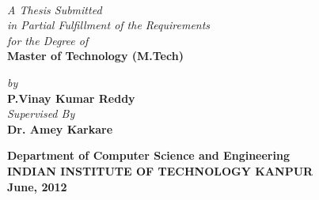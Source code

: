 \titlepage
\thispagestyle{empty}
\begin{center}
\\
\end{center}\vspace{15mm}
\begin{center}
{\it{A Thesis Submitted}}\\
{\it{in Partial Fulfillment of the Requirements}}\\
{\it{for the Degree of}}\\

{\bf {\large Master of Technology (M.Tech)}}\\
\vspace{15mm}

{\it{by}} \\
{\bf{\large P.Vinay Kumar Reddy}}\\

\vspace{1cm}
{\it{Supervised By}} \\
{\large \bf {Dr. Amey Karkare}}\\
\end{center}
\vspace{8mm}
\begin{figure}[h] 
{\par}
\end{figure} 
\begin{center}
\vspace{3mm}
{\bf {\large {\sc Department of Computer Science and Engineering}}}\\
\vspace{2mm}
{\bf {\large INDIAN INSTITUTE OF TECHNOLOGY KANPUR}}\\
\vspace{3mm}
{\textbf{June, 2012}}
\end{center}

